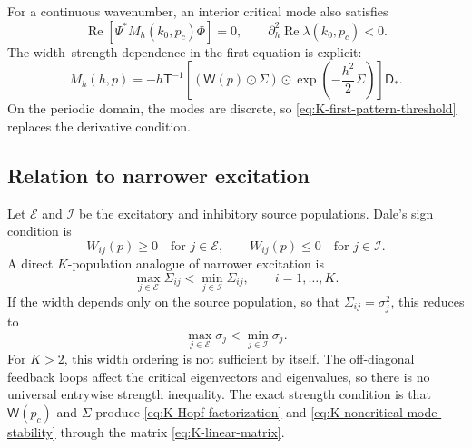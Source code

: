 For a continuous wavenumber, an interior critical mode also satisfies
\begin{equation}
 \operatorname{Re}\left[
 \Psi^*M_h(k_0,p_c)\Phi
 \right]=0,
 \qquad
 \partial_h^2\operatorname{Re}\lambda(k_0,p_c)<0.
 \label{eq:K-wavenumber-maximum}
\end{equation}
The width--strength dependence in the first equation is explicit:
\begin{equation}
 M_h(h,p)
 =-h\mathsf T^{-1}
 \left[
 \left(\mathsf W(p)\odot\Sigma\right)
 \odot\exp\left(-\frac{h^2}{2}\Sigma\right)
 \right]\mathsf D_*.
 \label{eq:K-wavenumber-derivative}
\end{equation}
On the periodic domain, the modes are discrete, so
\eqref{eq:K-first-pattern-threshold} replaces the derivative condition.

\subsection{Relation to narrower excitation}

Let $\mathcal E$ and $\mathcal I$ be the excitatory and inhibitory source
populations.  Dale's sign condition is
\begin{equation}
 W_{ij}(p)\geq0
 \quad\text{for }j\in\mathcal E,
 \qquad
 W_{ij}(p)\leq0
 \quad\text{for }j\in\mathcal I.
 \label{eq:K-Dale-condition}
\end{equation}
A direct $K$-population analogue of narrower excitation is
\begin{equation}
 \max_{j\in\mathcal E}\Sigma_{ij}
 <
 \min_{j\in\mathcal I}\Sigma_{ij},
 \qquad i=1,\ldots,K.
 \label{eq:K-narrower-excitation}
\end{equation}
If the width depends only on the source population, so that
$\Sigma_{ij}=\sigma_j^2$, this reduces to
\begin{equation}
 \max_{j\in\mathcal E}\sigma_j
 <
 \min_{j\in\mathcal I}\sigma_j.
 \label{eq:K-source-narrower-excitation}
\end{equation}
For $K>2$, this width ordering is not sufficient by itself.  The off-diagonal
feedback loops affect the critical eigenvectors and eigenvalues, so there is
no universal entrywise strength inequality.  The exact strength condition is
that $\mathsf W(p_c)$ and $\Sigma$ produce
\eqref{eq:K-Hopf-factorization} and
\eqref{eq:K-noncritical-mode-stability} through the matrix
\eqref{eq:K-linear-matrix}.

